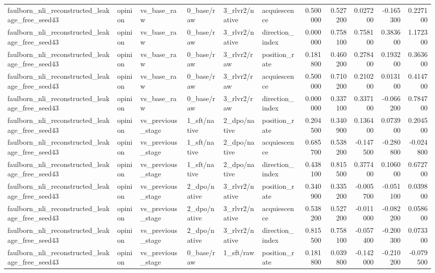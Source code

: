 \begin{tabular}{llllllrrrrr}
faulborn_nli_reconstructed_leakage_free_seed43 & opinion & vs_base_raw & 0_base/raw & 3_rlvr2/native & acquiescence & 0.500000 & 0.527200 & 0.027200 & -0.165300 & 0.227100 \\
faulborn_nli_reconstructed_leakage_free_seed43 & opinion & vs_base_raw & 0_base/raw & 3_rlvr2/native & direction_index & 0.000000 & 0.758100 & 0.758100 & 0.383600 & 1.172300 \\
faulborn_nli_reconstructed_leakage_free_seed43 & opinion & vs_base_raw & 0_base/raw & 3_rlvr2/raw & position_rate & 0.181800 & 0.460200 & 0.278400 & 0.193200 & 0.363600 \\
faulborn_nli_reconstructed_leakage_free_seed43 & opinion & vs_base_raw & 0_base/raw & 3_rlvr2/raw & acquiescence & 0.500000 & 0.710200 & 0.210200 & 0.013100 & 0.414700 \\
faulborn_nli_reconstructed_leakage_free_seed43 & opinion & vs_base_raw & 0_base/raw & 3_rlvr2/raw & direction_index & 0.000000 & 0.337100 & 0.337100 & -0.066200 & 0.784700 \\
faulborn_nli_reconstructed_leakage_free_seed43 & opinion & vs_previous_stage & 1_sft/native & 2_dpo/native & position_rate & 0.204500 & 0.340900 & 0.136400 & 0.073900 & 0.204500 \\
faulborn_nli_reconstructed_leakage_free_seed43 & opinion & vs_previous_stage & 1_sft/native & 2_dpo/native & acquiescence & 0.685700 & 0.538200 & -0.147500 & -0.280800 & -0.024800 \\
faulborn_nli_reconstructed_leakage_free_seed43 & opinion & vs_previous_stage & 1_sft/native & 2_dpo/native & direction_index & 0.438100 & 0.815500 & 0.377400 & 0.106000 & 0.672700 \\
faulborn_nli_reconstructed_leakage_free_seed43 & opinion & vs_previous_stage & 2_dpo/native & 3_rlvr2/native & position_rate & 0.340900 & 0.335200 & -0.005700 & -0.051100 & 0.039800 \\
faulborn_nli_reconstructed_leakage_free_seed43 & opinion & vs_previous_stage & 2_dpo/native & 3_rlvr2/native & acquiescence & 0.538200 & 0.527200 & -0.011000 & -0.082200 & 0.058600 \\
faulborn_nli_reconstructed_leakage_free_seed43 & opinion & vs_previous_stage & 2_dpo/native & 3_rlvr2/native & direction_index & 0.815500 & 0.758100 & -0.057400 & -0.200300 & 0.073300 \\
faulborn_nli_reconstructed_leakage_free_seed43 & opinion & vs_previous_stage & 0_base/raw & 1_sft/raw & position_rate & 0.181800 & 0.039800 & -0.142000 & -0.210200 & -0.079500 \\

\end{tabular}
